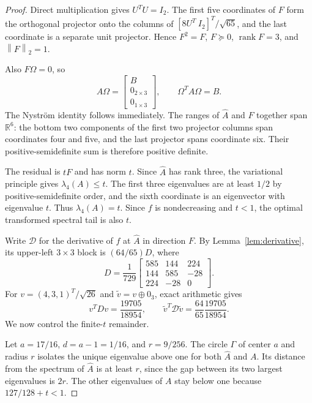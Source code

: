 \documentclass[11pt]{article}
\theoremstyle{definition}
\newcommand{\R}{\mathbb R}
\newcommand{\rank}{\operatorname{rank}}
\newcommand{\norm}[1]{\left\lVert#1\right\rVert}
\begin{document}
\begin{proof}
Direct multiplication gives $U^TU=I_2$. The first five coordinates of $F$ form the orthogonal projector onto the columns of $[8U^T\ I_2]^T/\sqrt{65}$, and the last coordinate is a separate unit projector. Hence $F^2=F$, $F\succeq0$, $\rank F=3$, and $\norm F_2=1$.

Also $F\Omega=0$, so
\[
 A\Omega=\begin{bmatrix}B\\0_{2\times3}\\0_{1\times3}\end{bmatrix},
 \qquad \Omega^TA\Omega=B.
\]
The Nystr\"om identity follows immediately. The ranges of $\widehat A$ and $F$ together span $\R^6$: the bottom two components of the first two projector columns span coordinates four and five, and the last projector spans coordinate six. Their positive-semidefinite sum is therefore positive definite.

The residual is $tF$ and has norm $t$. Since $\widehat A$ has rank three, the variational principle gives $\lambda_4(A)\le t$. The first three eigenvalues are at least $1/2$ by positive-semidefinite order, and the sixth coordinate is an eigenvector with eigenvalue $t$. Thus $\lambda_4(A)=t$. Since $f$ is nondecreasing and $t<1$, the optimal transformed spectral tail is also $t$.

Write $\mathcal D$ for the derivative of $f$ at $\widehat A$ in direction $F$. By Lemma~\ref{lem:derivative}, its upper-left $3\times3$ block is $(64/65)D$, where
\[
 D=\frac1{729}\begin{bmatrix}
 585&144&224\\144&585&-28\\224&-28&0
 \end{bmatrix}.
\]
For $v=(4,3,1)^T/\sqrt{26}$ and $\widetilde v=v\oplus0_3$, exact arithmetic gives
\begin{equation}\label{eq:witness}
 v^TDv=\frac{19705}{18954},\qquad
 \widetilde v^T\mathcal D\widetilde v
   =\frac{64}{65}\frac{19705}{18954}.
\end{equation}
We now control the finite-$t$ remainder.

Let $a=17/16$, $d=a-1=1/16$, and $r=9/256$. The circle $\Gamma$ of center $a$ and radius $r$ isolates the unique eigenvalue above one for both $\widehat A$ and $A$. Its distance from the spectrum of $\widehat A$ is at least $r$, since the gap between its two largest eigenvalues is $2r$. The other eigenvalues of $A$ stay below one because $127/128+t<1$.


\end{proof}
\end{document}
